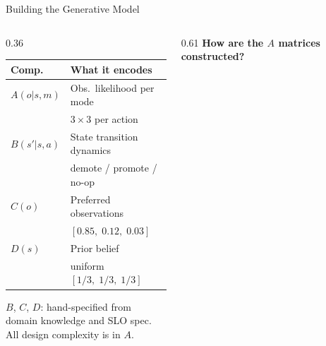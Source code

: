 \documentclass[aspectratio=169,10pt]{beamer}
\begin{document}
\begin{frame}{Building the Generative Model}
\begin{columns}[T]

  \begin{column}{0.36\textwidth}
    \vspace{0.2cm}
    \small
    \begin{tabular}{@{}p{0.9cm}p{3.8cm}@{}}
      \toprule
      \textbf{Comp.} & \textbf{What it encodes} \\
      \midrule
      $A(o|s,m)$   & Obs.\ likelihood per mode\\
                   & $3{\times}3$ per action \\\addlinespace
      $B(s'|s,a)$  & State transition dynamics\\
                   & demote / promote / no-op \\\addlinespace
      $C(o)$       & Preferred observations\\
                   & $[0.85,\;0.12,\;0.03]$ \\\addlinespace
      $D(s)$       & Prior belief\\
                   & uniform $[1/3,\;1/3,\;1/3]$ \\
      \bottomrule
    \end{tabular}
    \vspace{0.5em}

    \footnotesize\textcolor{mygray}{
      $B$, $C$, $D$: hand-specified from\\
      domain knowledge and SLO spec.\\[0.3em]
      All design complexity is in $A$.
    }
  \end{column}

  \begin{column}{0.61\textwidth}
    \vspace{0.1cm}
    \small\textbf{\textcolor{myblue}{How are the $A$ matrices constructed?}}
    \vspace{0.35cm}


\end{column}
\end{columns}
\end{frame}
\end{document}
